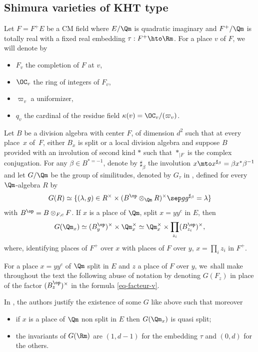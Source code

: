 \subsection{Shimura varieties of KHT type}

\label{para-geo}

Let $F=F^+ E$ be a CM field where $E/\Qm$ is quadratic imaginary and
$F^+/\Qm$ is
totally real with a fixed real embedding \hbox{$\tau:F^+ \hto \Rm$}. For a place $v$ of $F$,
we will denote by
\begin{itemize}
\item $F_v$ the completion of $F$ at $v$,

\item $\OC_v$ the ring of integers of $F_v$,

\item $\varpi_v$ a uniformizer,

\item $q_v$ the cardinal of the residue field $\kappa(v)=\OC_v/(\varpi_v)$.
\end{itemize}
Let $B$ be a division algebra with center $F$, of dimension $d^2$ such that at every place~$x$ of~$F$,
either $B_x$ is split or a local division algebra and suppose $B$ provided with an involution of
second kind $*$ such that $*_{|F}$ is the complex conjugation. For any
$\beta \in B^{*=-1}$, denote by $\sharp_\beta$ the involution $x \mto x^{\sharp_\beta}=\beta x^*
\beta^{-1}$ and let $G/\Qm$ be the group of similitudes, denoted by
$G_\tau$ in \cite{h-t}, defined for every $\Qm$-algebra $R$ by
\[
G(R) \simeq \{(\lambda,g) \in R^\times \times (B^{\op} \otimes_\Qm R)^\times \sep
gg^{\sharp_\beta}=\lambda\}
\]
with $B^{\op}=B \otimes_{F,c} F$.
If $x$ is a place of $\Qm$, split $x=yy^c$ in $E$, then
\begin{equation} \label{eq-facteur-v}
G(\Qm_x) \simeq (B_y^{\op})^\times \times \Qm_x^\times \simeq \Qm_x^\times \times
\prod_{z_i} (B_{z_i}^{\op})^\times,
\end{equation}
where, identifying places of $F^+$ over $x$ with places of $F$ over $y$,
$x=\prod_i z_i$ in $F^+$.

\begin{convention}
For a place $x=yy^c$ of $\Qm$ split in $E$ and $z$
a place of $F$ over $y$, we~shall make throughout the text the following abuse of notation by denoting
$G(F_z)$ in place of the factor $(B_z^{\op})^\times$ in the formula \eqref{eq-facteur-v}.
\end{convention}

In \cite{h-t}, the authors justify the existence of some $G$ like above such that moreover
\begin{itemize}
\item if $x$ is a place of $\Qm$ non split in $E$ then $G(\Qm_x)$ is quasi split;

\item the invariants of $G(\Rm)$ are $(1,d-1)$ for the embedding $\tau$ and $(0,d)$ for the others.
\end{itemize}

